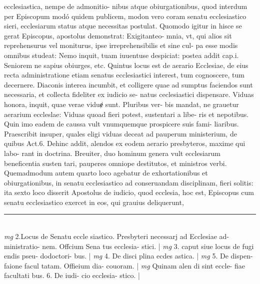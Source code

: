\documentclass{article}
\begin{document}
\begin{pages}
ecclesiastica, nempe de admonitio- nibus atque  obiurgationibus, quod interdum per Episcopum modó quidem publicem, modon vero coram senatu ecclesiastico sieri, ecclesiarum status atque  necessitas postulat. Quomodo igitur in hisce se gerat Episcopus, apostolus demonstrat: Exigitanteo- mnia, vt, qui alios sit reprehensurus vel moniturus, ipse irreprehensibilis et sine cul-   pa esse modis omnibus studeat: Nemo inquit, tuam iuuentuse despiciat: postea addit cap.i.   Seniorem ne sapius obiurges, etc.  \pend\pstart Quintus locus est de aerario Ecclesiae, de eius recta administratione etiam senatus ecclesiastici interest, tum cognoscere, tum decernere. Diaconis interea incumbit, et colligere quae ad sumptus faciendos sunt necessaria, et collecta fideliter ex iudicio se- natus ceclesiastici dispensare. Viduas honora, inquit, quae verae viduɇ sunt. Pluribus ver- bis mandat, ne grauetur aerarium eccleslae: Viduas quoad fieri potest, sustentari a libe- ris et nepotibus. Quin imo eadem de caussa vult vnumquemque  prospicere suis fami- liaribus. Praescribit insuper, quales eligi viduas deceat ad pauperum ministerium, de quibus Act.6. Dehinc addit, alendos ex eodem aerario presbyteros, maxime qui labo- rant in doctrina. Breuiter, duo hominum genera vult ecclesiarum beneficentia susten tari, pauperes omniope destitutos, et ministros verbi. Quemadmodum autem quarto loco agebatur de exhortationibus et obiurgationibus, in senatu ecclesiastico ad conseruandam disciplinam, fieri solitis: ita sexto loco disserit Apostolus de iudicio, quod ecclesia, hoc est, Episcopus cum senatu ecclesiastico exercet in eos, qui grauius deliquerunt,  \pend
\vspace{0.5cm}\noindent
\vspace{0.2cm}\rule{1cm}{0.2pt}\\ 
\hspace{0.2cm}\textit{mg}
\footnotesize 2.Locus de Senatu eccle siastico. Presbyteri necessarj ad Ecclesiae ad- ministratio- nem. Offcium Sena tus ecclesia- stici. 
\normalsize| 
\hspace{0.2cm}\textit{mg}
\footnotesize 3. caput siue locus de fugi endis pseu- dodoctori- bus. 
\normalsize| 
\hspace{0.2cm}\textit{mg}
\footnotesize 4. De disci plina ecdes astica. 
\normalsize| 
\hspace{0.2cm}\textit{mg}
\footnotesize 5. De dispen- faione facul tatam. Offieium dia- couoram. 
\normalsize| 
\hspace{0.2cm}\textit{mg}
\footnotesize Quinam alen di sint eccle- fiae facultati bus. 6. De iudi- cio ecclesia- stico. 
\normalsize| 

\end{pages}
\end{document}
